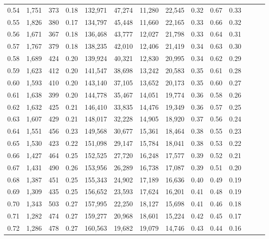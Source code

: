 \begin{tabular}{rrrrrrrrrrrrrr}
0.54 &  1,751 &    373 &  0.18 &  132,971 &   47,274 &  11,280 &  22,545 &  0.32 &  0.67 &      0.33 \\
0.55 &  1,826 &    380 &  0.17 &  134,797 &   45,448 &  11,660 &  22,165 &  0.33 &  0.66 &      0.32 \\
0.56 &  1,671 &    367 &  0.18 &  136,468 &   43,777 &  12,027 &  21,798 &  0.33 &  0.64 &      0.31 \\
0.57 &  1,767 &    379 &  0.18 &  138,235 &   42,010 &  12,406 &  21,419 &  0.34 &  0.63 &      0.30 \\
0.58 &  1,689 &    424 &  0.20 &  139,924 &   40,321 &  12,830 &  20,995 &  0.34 &  0.62 &      0.29 \\
0.59 &  1,623 &    412 &  0.20 &  141,547 &   38,698 &  13,242 &  20,583 &  0.35 &  0.61 &      0.28 \\
0.60 &  1,593 &    410 &  0.20 &  143,140 &   37,105 &  13,652 &  20,173 &  0.35 &  0.60 &      0.27 \\
0.61 &  1,638 &    399 &  0.20 &  144,778 &   35,467 &  14,051 &  19,774 &  0.36 &  0.58 &      0.26 \\
0.62 &  1,632 &    425 &  0.21 &  146,410 &   33,835 &  14,476 &  19,349 &  0.36 &  0.57 &      0.25 \\
0.63 &  1,607 &    429 &  0.21 &  148,017 &   32,228 &  14,905 &  18,920 &  0.37 &  0.56 &      0.24 \\
0.64 &  1,551 &    456 &  0.23 &  149,568 &   30,677 &  15,361 &  18,464 &  0.38 &  0.55 &      0.23 \\
0.65 &  1,530 &    423 &  0.22 &  151,098 &   29,147 &  15,784 &  18,041 &  0.38 &  0.53 &      0.22 \\
0.66 &  1,427 &    464 &  0.25 &  152,525 &   27,720 &  16,248 &  17,577 &  0.39 &  0.52 &      0.21 \\
0.67 &  1,431 &    490 &  0.26 &  153,956 &   26,289 &  16,738 &  17,087 &  0.39 &  0.51 &      0.20 \\
0.68 &  1,387 &    451 &  0.25 &  155,343 &   24,902 &  17,189 &  16,636 &  0.40 &  0.49 &      0.19 \\
0.69 &  1,309 &    435 &  0.25 &  156,652 &   23,593 &  17,624 &  16,201 &  0.41 &  0.48 &      0.19 \\
0.70 &  1,343 &    503 &  0.27 &  157,995 &   22,250 &  18,127 &  15,698 &  0.41 &  0.46 &      0.18 \\
0.71 &  1,282 &    474 &  0.27 &  159,277 &   20,968 &  18,601 &  15,224 &  0.42 &  0.45 &      0.17 \\
0.72 &  1,286 &    478 &  0.27 &  160,563 &   19,682 &  19,079 &  14,746 &  0.43 &  0.44 &      0.16 \\

\end{tabular}

